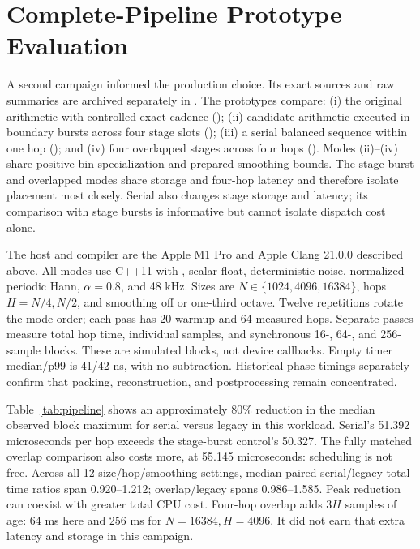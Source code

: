 \section{Complete-Pipeline Prototype Evaluation}
\label{sec:pipeline-evaluation}
A second campaign informed the production choice. Its exact sources and raw
summaries are archived separately in . The
prototypes compare: (i) the original arithmetic with controlled exact cadence
(); (ii) candidate arithmetic executed in boundary bursts across four stage slots
(); (iii) a serial balanced sequence within one hop
(); and (iv) four overlapped stages across four hops
(). Modes (ii)--(iv) share positive-bin specialization and
prepared smoothing bounds. The stage-burst and overlapped modes share storage and four-hop latency and
therefore isolate placement most closely. Serial also changes stage storage
and latency; its comparison with stage bursts is informative but cannot
isolate dispatch cost alone.

The host and compiler are the Apple M1 Pro and Apple Clang 21.0.0 described
above. All modes use C++11 with ,
scalar float, deterministic noise, normalized periodic Hann, $\alpha=0.8$,
and 48 kHz. Sizes are $N\in\{1024,4096,16384\}$, hops $H=N/4,N/2$, and
smoothing off or one-third octave. Twelve repetitions rotate the mode order;
each pass has 20 warmup and 64 measured hops. Separate passes measure total
hop time, individual samples, and synchronous 16-, 64-, and 256-sample blocks.
These are simulated blocks, not device callbacks. Empty timer median/p99 is
41/42 ns, with no subtraction. Historical phase timings separately confirm
that packing, reconstruction, and postprocessing remain concentrated.



Table~\ref{tab:pipeline} shows an approximately 80\% reduction in the median
observed block maximum for serial versus legacy in this workload. Serial's
51.392 microseconds per hop exceeds the stage-burst control's 50.327. The
fully matched overlap comparison also costs more, at 55.145 microseconds:
scheduling is not free. Across all 12 size/hop/smoothing settings, median paired
serial/legacy total-time ratios span 0.920--1.212; overlap/legacy spans
0.986--1.585. Peak reduction can coexist with greater total CPU cost. Four-hop
overlap adds $3H$ samples of age: 64 ms here and 256 ms for $N=16384,H=4096$.
It did not earn that extra latency and storage in this campaign.

